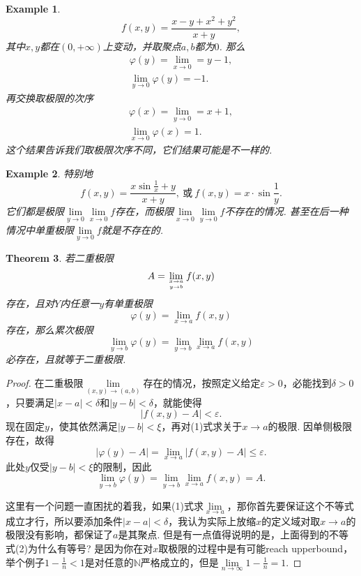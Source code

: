 \documentclass{article}
\newtheorem{theorem}{Theorem}[section]
\newtheorem{example}[theorem]{Example}
\begin{document}
\begin{example}
\rm $$
	f(x,y) = \frac{x-y + x^2 + y^2}{x + y},
$$
其中$x,y$都在$(0,+\infty)$上变动，并取聚点$a,b$都为$0$. 那么
$$
\begin{array}{l}
\varphi(y) = \lim\limits_{x \rightarrow 0} = y -1, \\
\lim\limits_{y \rightarrow 0} \varphi(y) = -1.
\end{array}
$$
再交换取极限的次序
$$
\begin{array}{l}
\varphi(x) = \lim\limits_{y \rightarrow 0} = x+1, \\
\lim\limits_{x \rightarrow 0} \varphi(x) = 1.
\end{array}
$$
{\color{red} 这个结果告诉我们取极限次序不同，它们结果可能是不一样的}.
\end{example}

\begin{example}
\rm 特别地
$$
f(x,y) = \frac{x\sin\frac{1}{x} + {y}}{x+y},~\text{或}~f(x,y)= x \cdot \sin\frac{1}{y}.
$$
它们都是极限$\lim\limits_{y \rightarrow 0}\lim\limits_{x \rightarrow 0}f$存在，而极限$\lim\limits_{x \rightarrow 0}\lim\limits_{y \rightarrow 0}f$不存在的情况. 甚至在后一种情况中单重极限$\lim\limits_{y \rightarrow 0}f$就是不存在的.
\end{example}

\begin{theorem}
\rm 若二重极限
$$
A = \lim\limits_{x \rightarrow a \atop y \rightarrow b}f(x,y)
$$
存在，且对$Y$内任意一$y$有单重极限
$$
\varphi(y) = \lim\limits_{x \rightarrow a}f(x,y)
$$
存在，那么累次极限
$$
\lim\limits_{y \rightarrow b}\varphi(y) = \lim\limits_{y \rightarrow b}\lim\limits_{x \rightarrow a}f(x,y)
$$
必存在，且就等于二重极限.
\end{theorem}

\begin{proof}
在二重极限$\lim\limits_{(x,y) \to (a,b)}$存在的情况，按照定义给定$\varepsilon >0$，必能找到$\delta > 0$，只要满足$|x - a| < \delta$和$|y-b| < \delta$，就能使得
\begin{equation}
|f(x,y) - A| < \varepsilon.
\end{equation}
现在固定$y$，使其依然满足$|y-b| < \xi$，再对(1)式求关于$x \to a$的极限. 因单侧极限存在，故得
\begin{equation}
|\varphi(y)-A| = \lim\limits_{x \to a}|f(x,y) - A|  \leq \varepsilon.
\end{equation}
此处$y$仅受$|y-b| < \xi$的限制，因此
$$
\lim\limits_{y \to b}\varphi(y) = \lim\limits_{y \to b}\lim\limits_{x \to a}f(x,y) = A.
$$

这里有一个问题一直困扰的着我，如果(1)式求$\lim\limits_{x \rightarrow a}$，那你首先要保证这个不等式成立才行，所以要添加条件$|x -a | < \delta$，我认为实际上放缩$x$的定义域对取$x \rightarrow a$的极限没有影响，都保证了$a$是其聚点. {\color{blue}但是有一点值得说明的是，上面得到的不等式(2)为什么有等号?} 是因为你在对$x$取极限的过程中是有可能reach upperbound，举个例子$1-\frac{1}{n} < 1$是对任意的$\mathbb{N}$严格成立的，但是$\lim\limits_{n \rightarrow \infty} 1-\frac{1}{n} = 1$. 
\end{proof}
\end{document}

